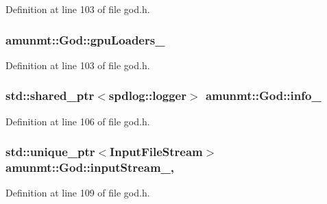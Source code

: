Definition at line 103 of file god.\+h.

\subsubsection[{\texorpdfstring{gpu\+Loaders\+\_\+}{gpuLoaders_}}]{ amunmt\+::\+God\+::gpu\+Loaders\+\_\+\hspace{0.3cm}{\ttfamily [private]}}\hypertarget{classamunmt_1_1God_a2a713e550f5ee7296e7a66bd0b98339d}{}\label{classamunmt_1_1God_a2a713e550f5ee7296e7a66bd0b98339d}


Definition at line 103 of file god.\+h.

\subsubsection[{\texorpdfstring{info\+\_\+}{info_}}]{\setlength{\rightskip}{0pt plus 5cm}std\+::shared\+\_\+ptr$<$spdlog\+::logger$>$ amunmt\+::\+God\+::info\+\_\+\hspace{0.3cm}{\ttfamily [private]}}\hypertarget{classamunmt_1_1God_a7df10015474c9e2f00b104f23615c661}{}\label{classamunmt_1_1God_a7df10015474c9e2f00b104f23615c661}


Definition at line 106 of file god.\+h.

\subsubsection[{\texorpdfstring{input\+Stream\+\_\+}{inputStream_}}]{\setlength{\rightskip}{0pt plus 5cm}std\+::unique\+\_\+ptr$<${\bf Input\+File\+Stream}$>$ amunmt\+::\+God\+::input\+Stream\+\_\+\hspace{0.3cm}{\ttfamily [mutable]}, {\ttfamily [private]}}\hypertarget{classamunmt_1_1God_ad61c0588d0ce38a334d220337e5185d3}{}\label{classamunmt_1_1God_ad61c0588d0ce38a334d220337e5185d3}


Definition at line 109 of file god.\+h.

